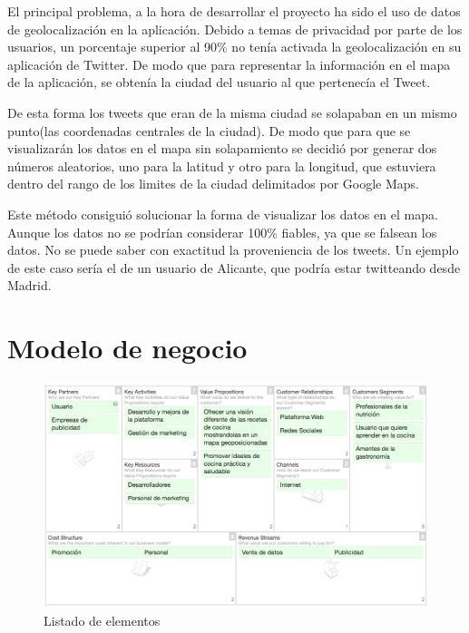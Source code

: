 El principal problema, a la hora de desarrollar el proyecto ha sido el uso de datos de geolocalización en la aplicación. Debido a temas de privacidad por parte de los usuarios, un porcentaje superior al 90\% no tenía activada la geolocalización en su aplicación de Twitter. De modo que para representar la información en el mapa de la aplicación, se obtenía la ciudad del usuario al que pertenecía el Tweet.

\vspace{5 mm}

De esta forma los tweets que eran de la misma ciudad se solapaban en un mismo punto(las coordenadas centrales de la ciudad). De modo que para que se visualizarán los datos en el mapa sin solapamiento se decidió por generar dos números aleatorios, uno para la latitud y otro para la longitud, que estuviera dentro del rango de los limites de la ciudad delimitados por Google Maps.

\vspace{5 mm}

Este método consiguió solucionar la forma de visualizar los datos en el mapa. Aunque los datos no se podrían considerar 100\% fiables, ya que se falsean los datos. No se puede saber con exactitud la proveniencia de los tweets. Un ejemplo de este caso sería el de un usuario de Alicante, que podría estar twitteando desde Madrid.

\section{Modelo de negocio}

\begin{figure}
\begin{center}
\includegraphics[width=1.0\textwidth]{imagenes/business-canvas.png}
\caption{Listado de elementos}
\label{business-canvas}
\end{center}
\end{figure}

